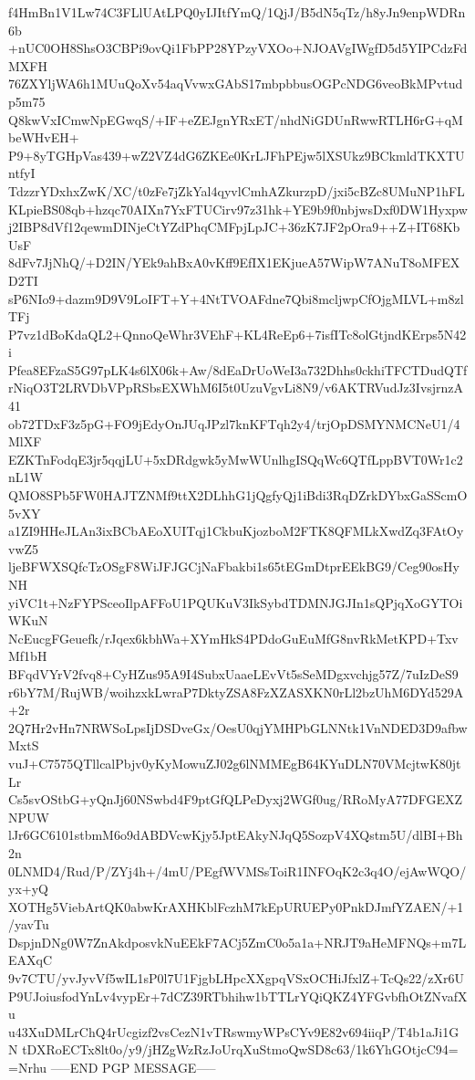 f4HmBn1V1Lw74C3FLlUAtLPQ0yIJItfYmQ/1QjJ/B5dN5qTz/h8yJn9enpWDRn6b
+nUC0OH8ShsO3CBPi9ovQi1FbPP28YPzyVXOo+NJOAVgIWgfD5d5YIPCdzFdMXFH
76ZXYljWA6h1MUuQoXv54aqVvwxGAbS17mbpbbusOGPcNDG6veoBkMPvtudp5m75
Q8kwVxICmwNpEGwqS/+IF+eZEJgnYRxET/nhdNiGDUnRwwRTLH6rG+qMbeWHvEH+
P9+8yTGHpVas439+wZ2VZ4dG6ZKEe0KrLJFhPEjw5lXSUkz9BCkmldTKXTUntfyI
TdzzrYDxhxZwK/XC/t0zFe7jZkYal4qyvlCmhAZkurzpD/jxi5cBZc8UMuNP1hFL
KLpieBS08qb+hzqc70AIXn7YxFTUCirv97z31hk+YE9b9f0nbjwsDxf0DW1Hyxpw
j2IBP8dVf12qewmDINjeCtYZdPhqCMFpjLpJC+36zK7JF2pOra9++Z+IT68KbUsF
8dFv7JjNhQ/+D2IN/YEk9ahBxA0vKff9EfIX1EKjueA57WipW7ANuT8oMFEXD2TI
sP6NIo9+dazm9D9V9LoIFT+Y+4NtTVOAFdne7Qbi8mcljwpCfOjgMLVL+m8zlTFj
P7vz1dBoKdaQL2+QnnoQeWhr3VEhF+KL4ReEp6+7isfITc8olGtjndKErps5N42i
Pfea8EFzaS5G97pLK4s6lX06k+Aw/8dEaDrUoWeI3a732Dhhs0ckhiTFCTDudQTf
rNiqO3T2LRVDbVPpRSbsEXWhM6I5t0UzuVgvLi8N9/v6AKTRVudJz3IvsjrnzA41
ob72TDxF3z5pG+FO9jEdyOnJUqJPzl7knKFTqh2y4/trjOpDSMYNMCNeU1/4MlXF
EZKTnFodqE3jr5qqjLU+5xDRdgwk5yMwWUnlhgISQqWc6QTfLppBVT0Wr1c2nL1W
QMO8SPb5FW0HAJTZNMf9ttX2DLhhG1jQgfyQj1iBdi3RqDZrkDYbxGaSScmO5vXY
a1ZI9HHeJLAn3ixBCbAEoXUITqj1CkbuKjozboM2FTK8QFMLkXwdZq3FAtOyvwZ5
ljeBFWXSQfcTzOSgF8WiJFJGCjNaFbakbi1s65tEGmDtprEEkBG9/Ceg90osHyNH
yiVC1t+NzFYPSceoIlpAFFoU1PQUKuV3IkSybdTDMNJGJIn1sQPjqXoGYTOiWKuN
NcEucgFGeuefk/rJqex6kbhWa+XYmHkS4PDdoGuEuMfG8nvRkMetKPD+TxvMf1bH
BFqdVYrV2fvq8+CyHZus95A9I4SubxUaaeLEvVt5sSeMDgxvchjg57Z/7uIzDeS9
r6bY7M/RujWB/woihzxkLwraP7DktyZSA8FzXZASXKN0rLl2bzUhM6DYd529A+2r
2Q7Hr2vHn7NRWSoLpsIjDSDveGx/OesU0qjYMHPbGLNNtk1VnNDED3D9afbwMxtS
vuJ+C7575QTllcalPbjv0yKyMowuZJ02g6lNMMEgB64KYuDLN70VMcjtwK80jtLr
Cs5svOStbG+yQnJj60NSwbd4F9ptGfQLPeDyxj2WGf0ug/RRoMyA77DFGEXZNPUW
lJr6GC6101stbmM6o9dABDVcwKjy5JptEAkyNJqQ5SozpV4XQstm5U/dlBI+Bh2n
0LNMD4/Rud/P/ZYj4h+/4mU/PEgfWVMSsToiR1INFOqK2c3q4O/ejAwWQO/yx+yQ
XOTHg5ViebArtQK0abwKrAXHKblFczhM7kEpURUEPy0PnkDJmfYZAEN/+1/yavTu
DspjnDNg0W7ZnAkdposvkNuEEkF7ACj5ZmC0o5a1a+NRJT9aHeMFNQs+m7LEAXqC
9v7CTU/yvJyvVf5wIL1sP0l7U1FjgbLHpcXXgpqVSxOCHiJfxlZ+TcQs22/zXr6U
P9UJoiusfodYnLv4vypEr+7dCZ39RTbhihw1bTTLrYQiQKZ4YFGvbfhOtZNvafXu
u43XuDMLrChQ4rUcgizf2vsCezN1vTRswmyWPsCYv9E82v694iiqP/T4b1aJi1GN
tDXRoECTx8lt0o/y9/jHZgWzRzJoUrqXuStmoQwSD8c63/1k6YhGOtjcC94=
=Nrhu
-----END PGP MESSAGE-----
